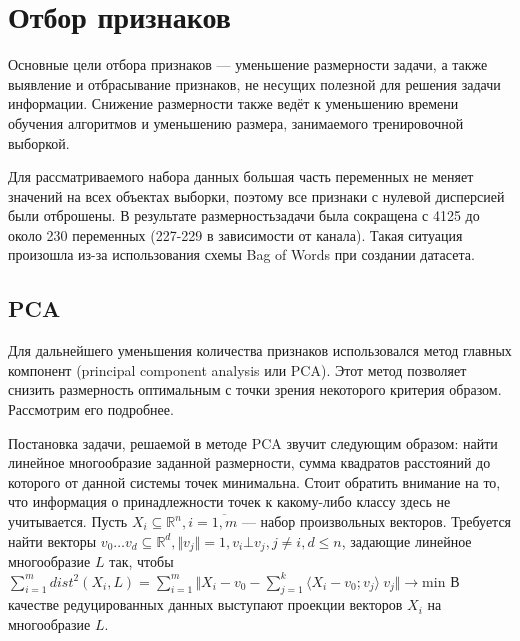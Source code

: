 \section{Отбор признаков}
Основные цели отбора признаков --- уменьшение размерности задачи, а также выявление и отбрасывание признаков,
 не несущих полезной для решения задачи информации. Снижение размерности также ведёт к уменьшению времени обучения алгоритмов и уменьшению размера, занимаемого тренировочной выборкой.
 \par
Для рассматриваемого набора данных большая часть переменных не меняет значений на всех объектах выборки,
 поэтому все признаки с нулевой дисперсией были отброшены. В результате размерностьзадачи была сокращена
 с 4125 до около 230 переменных (227-229 в зависимости от канала). Такая ситуация произошла из-за использования схемы Bag of Words при создании датасета. 
 \subsection{PCA}
 Для дальнейшего уменьшения количества признаков использовался метод главных компонент
 (principal component analysis или PCA). Этот метод позволяет снизить размерность оптимальным с точки зрения некоторого критерия образом. Рассмотрим его подробнее.
 \par
 Постановка задачи, решаемой в методе PCA звучит следующим образом: найти линейное многообразие заданной 
 размерности, сумма квадратов расстояний до которого от данной системы точек минимальна. Стоит обратить внимание на то, что информация о принадлежности точек к какому-либо классу здесь не учитывается.
 Пусть \( X_i \subseteq \mathbb{R}^n, i=\overline{1,m} \) --- набор произвольных векторов. Требуется найти векторы \(v_0\ldots v_d\subseteq \mathbb{R}^d, \Vert v_j \Vert = 1, v_i \bot v_j, j \neq  i, d \leq n\), задающие линейное многообразие \(L\) так, чтобы \(
 \sum_{i=1}^{m} dist^2(X_i, L) = \sum_{i=1}^{m}\Vert X_i - v_0 - \sum_{j=1}^k\langle X_i - v_0; v_j\rangle\ v_j \Vert\rightarrow \mathrm{min}\) В качестве редуцированных данных выступают проекции векторов \( X_i\) на многообразие \(L\). 
 
 
 
